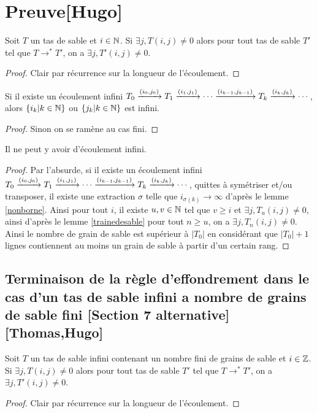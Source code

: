\section{Preuve[Hugo]}

\begin{lem}
\label{trainedesable}
Soit $T$ un tas de sable et $i\in\mathbb{N}$.
Si $\exists j,T(i,j)\neq 0$ alors pour tout tas de sable $T'$ tel que $T\rightarrow^*T'$, on a $\exists j,T'(i,j)\neq 0$.
\end{lem}
\begin{proof}
Clair par récurrence sur la longueur de l'écoulement.
\end{proof}

\begin{lem}
\label{nonborne}
Si il existe un écoulement infini $T_0\xrightarrow{(i_{0},j_{0})}T_1\xrightarrow{(i_{1},j_{1})} \cdots \xrightarrow{(i_{k-1},j_{k-1})} T_k \xrightarrow{(i_{k},j_{k})} \cdots$, alors $\{i_k|k\in\mathbb{N}\}$ ou $\{j_k|k\in\mathbb{N}\}$ est infini.
\end{lem}
\begin{proof}
Sinon on se ramène au cas fini.
\end{proof}

\begin{theo}
Il ne peut y avoir d'écoulement infini.
\end{theo}
\begin{proof}
Par l'absurde, si il existe un écoulement infini $T_0\xrightarrow{(i_{0},j_{0})}T_1\xrightarrow{(i_{1},j_{1})} \cdots \xrightarrow{(i_{k-1},j_{k-1})} T_k \xrightarrow{(i_{k},j_{k})} \cdots$, quittes à symétriser et/ou transposer, il existe une extraction $\sigma$ telle que $i_{\sigma(k)}\rightarrow\infty$ d'après le lemme \ref{nonborne}. Ainsi pour tout $i$, il existe $u,v\in\mathbb{N}$ tel que $v\geq i$ et $\exists j,T_u(i,j)\neq 0$, ainsi d'après le lemme \ref{trainedesable} pour tout $n\geq u$, on a $\exists j,T_n(i,j)\neq 0$. Ainsi le nombre de grain de sable est supérieur à $|T_0|$ en considérant que $|T_0|+1$ lignes contiennent au moins un grain de sable à partir d'un certain rang.
\end{proof}


\subsection{Terminaison de la règle d'effondrement dans le cas d'un tas de sable infini a nombre de grains de sable fini [Section 7 alternative][Thomas,Hugo]}

\begin{lem}
Soit $T$ un tas de sable infini contenant un nombre fini de grains de sable et $i\in\mathbb{Z}$.
Si $\exists j,T(i,j)\neq 0$ alors pour tout tas de sable $T'$ tel que $T\rightarrow^*T'$, on a $\exists j,T'(i,j)\neq 0$.
\end{lem}
\begin{proof}
Clair par récurrence sur la longueur de l'écoulement.
\end{proof}

